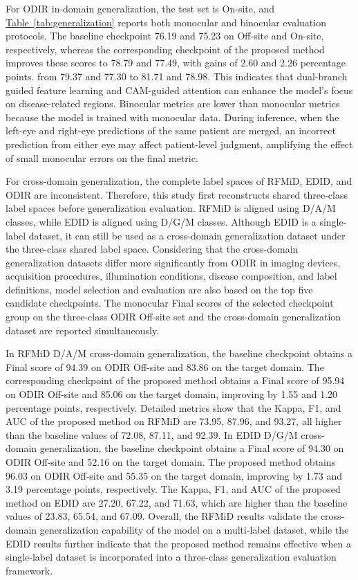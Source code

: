 For ODIR in-domain generalization, the test set is On-site, and \hyperref[tab:generalization]{Table~\ref*{tab:generalization}} reports both monocular and binocular evaluation protocols. The baseline checkpoint  76.19 and 75.23 on Off-site and On-site, respectively, whereas the corresponding checkpoint of the proposed method improves these scores to 78.79 and 77.49, with gains of 2.60 and 2.26 percentage points.  from 79.37 and 77.30 to 81.71 and 78.98. This indicates that dual-branch guided feature learning and CAM-guided attention can enhance the model's focus on disease-related regions. Binocular metrics are lower than monocular metrics because the model is trained with monocular data. During inference, when the left-eye and right-eye predictions of the same patient are merged, an incorrect prediction from either eye may affect patient-level judgment, amplifying the effect of small monocular errors on the final metric.

For cross-domain generalization, the complete label spaces of RFMiD, EDID, and ODIR are inconsistent. Therefore, this study first reconstructs shared three-class label spaces before generalization evaluation. RFMiD is aligned using D/A/M classes, while EDID is aligned using D/G/M classes. Although EDID is a single-label dataset, it can still be used as a cross-domain generalization dataset under the three-class shared label space. Considering that the cross-domain generalization datasets differ more significantly from ODIR in imaging devices, acquisition procedures, illumination conditions, disease composition, and label definitions, model selection and evaluation are also based on the top five candidate checkpoints. The monocular Final scores of the selected checkpoint group on the three-class ODIR Off-site set and the cross-domain generalization dataset are reported simultaneously.

In RFMiD D/A/M cross-domain generalization, the baseline checkpoint obtains a Final score of 94.39 on ODIR Off-site and 83.86 on the target domain. The corresponding checkpoint of the proposed method obtains a Final score of 95.94 on ODIR Off-site and 85.06 on the target domain, improving by 1.55 and 1.20 percentage points, respectively. Detailed metrics show that the Kappa, F1, and AUC of the proposed method on RFMiD are 73.95, 87.96, and 93.27, all higher than the baseline values of 72.08, 87.11, and 92.39. In EDID D/G/M cross-domain generalization, the baseline checkpoint obtains a Final score of 94.30 on ODIR Off-site and 52.16 on the target domain. The proposed method obtains 96.03 on ODIR Off-site and 55.35 on the target domain, improving by 1.73 and 3.19 percentage points, respectively. The Kappa, F1, and AUC of the proposed method on EDID are 27.20, 67.22, and 71.63, which are higher than the baseline values of 23.83, 65.54, and 67.09. Overall, the RFMiD results validate the cross-domain generalization capability of the model on a multi-label dataset, while the EDID results further indicate that the proposed method remains effective when a single-label dataset is incorporated into a three-class generalization evaluation framework.

